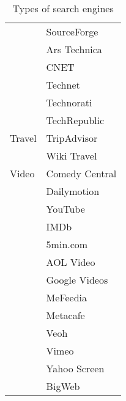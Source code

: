 \begin{center}
\begin{table}
\begin{tabular}{ | l | l | }
& 	SourceForge	\\
& 	Ars Technica	\\
& 	CNET	\\
& 	Technet	\\
& 	Technorati	\\
& 	TechRepublic	\\
\hline
Travel
& 	TripAdvisor	\\
& 	Wiki Travel	\\
\hline
Video
& 	Comedy Central	\\
& 	Dailymotion	\\
& 	YouTube	\\
& 	IMDb	\\
& 	5min.com	\\
& 	AOL Video	\\
& 	Google Videos	\\
& 	MeFeedia	\\
& 	Metacafe	\\
& 	Veoh	\\
& 	Vimeo	\\
& 	Yahoo Screen	\\
& 	BigWeb	\\
\hline
  \end{tabular}

\caption{Types of search engines}
\label{tab:selectionRik}

\end{table}
\end{center}